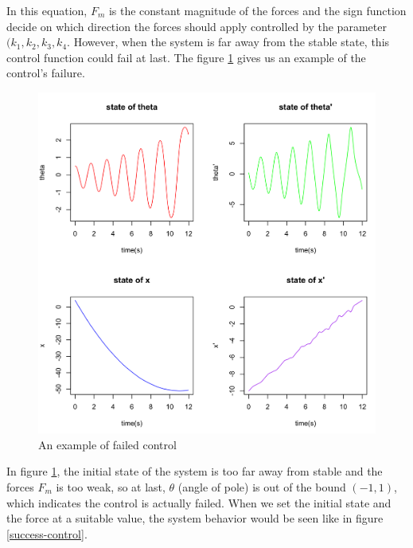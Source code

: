 \documentclass[11pt,twoside,a4paper]{article}
\begin{document}
In this equation, $F_m$ is the constant magnitude of the forces and
the sign function decide on which direction the forces should apply
controlled by the parameter $(k_1, k_2, k_3, k_4$. However, when the
system is far away from the stable state, this control function could
fail at last. The figure \ref{fail-control} gives us an example of the
control's failure.\\

\begin{figure}[h!]
\begin{center}
\includegraphics[width=14cm]{fail-control.png}
\caption{An example of failed control}
\label{fail-control}
\end{center}
\end{figure}

In figure \ref{fail-control}, the initial state of the system is too
far away from stable and the forces $F_m$ is too weak, so at last,
$\theta$ (angle of pole) is out of the bound $(-1, 1)$, which indicates
the control is actually failed. When we set the initial state and the
force at a suitable value, the system behavior would be seen like in
figure \ref{success-control}.\\
\end{document}
